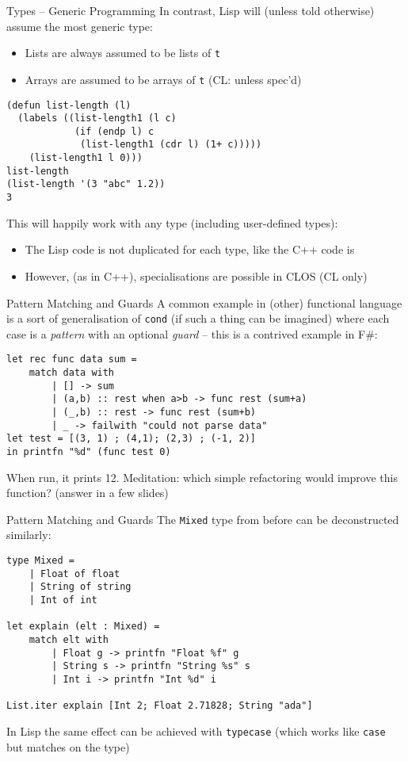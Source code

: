 \documentclass[presentation]{beamer}
\begin{document}
\begin{frame}[fragile]{Types -- Generic Programming}
  In contrast, Lisp will (unless told otherwise) assume the most generic type:
  \begin{itemize}
  \item Lists are always assumed to be lists of \texttt{t}
  \item Arrays are assumed to be arrays of \texttt{t} (CL: unless spec'd)
  \end{itemize}
\begin{verbatim}
(defun list-length (l)
  (labels ((list-length1 (l c)
            (if (endp l) c
             (list-length1 (cdr l) (1+ c)))))
    (list-length1 l 0)))
list-length
(list-length '(3 "abc" 1.2))
3
\end{verbatim}
  This will happily work with any type (including user-defined types):
  \begin{itemize}
  \item The Lisp code is not duplicated for each type, like the C++ code is
  \item However, (as in C++), specialisations are possible in CLOS (CL only)
  \end{itemize}
\end{frame}

\begin{frame}[fragile]{Pattern Matching and Guards}
  A common example in (other) functional language is a sort of generalisation of \texttt{cond} (if such a thing can be imagined) where each case is a \emph{pattern} with an optional \emph{guard} -- this is a contrived example in F\#:
\begin{verbatim}
let rec func data sum =
    match data with
        | [] -> sum
        | (a,b) :: rest when a>b -> func rest (sum+a)
        | (_,b) :: rest -> func rest (sum+b)
        | _ -> failwith "could not parse data"
let test = [(3, 1) ; (4,1); (2,3) ; (-1, 2)]
in printfn "%d" (func test 0)
\end{verbatim}
When run, it prints 12.  Meditation: which simple refactoring would improve this function? (answer in a few slides)
\end{frame}

\begin{frame}[fragile]{Pattern Matching and Guards}
  The \texttt{Mixed} type from before can be deconstructed similarly:
\begin{verbatim}
type Mixed =
    | Float of float
    | String of string
    | Int of int

let explain (elt : Mixed) =
    match elt with
        | Float g -> printfn "Float %f" g
        | String s -> printfn "String %s" s
        | Int i -> printfn "Int %d" i

List.iter explain [Int 2; Float 2.71828; String "ada"]
\end{verbatim}
In Lisp the same effect can be achieved with \texttt{typecase} (which works like \texttt{case} but matches on the type)
\end{frame}
\end{document}

